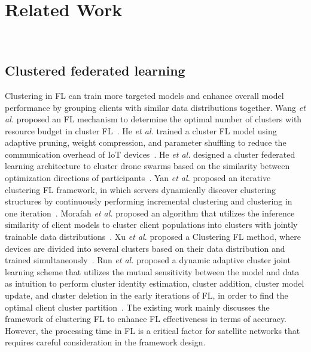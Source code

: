 \section{Related Work}~\label{sec:relatedwork}
\subsection{Clustered federated learning}
Clustering in FL can train more targeted models and enhance overall model performance by grouping clients with similar data distributions together. Wang \textit{et al.} proposed an FL mechanism to determine the optimal number of clusters with resource budget in cluster FL~\cite {WangTMC22}. He \textit{et al.} trained a cluster FL model using adaptive pruning, weight compression, and parameter shuffling to reduce the communication overhead of IoT devices~\cite {HeIOT24}. He \textit{et al.} designed a cluster federated learning architecture to cluster drone swarms based on the similarity between optimization directions of participants~\cite {HeTVT23}. Yan \textit{et al.} proposed an iterative clustering FL framework, in which servers dynamically discover clustering structures by continuously performing incremental clustering and clustering in one iteration~\cite{YanTNNLS23}. Morafah \textit{et al.} proposed an algorithm that utilizes the inference similarity of client models to cluster client populations into clusters with jointly trainable data distributions~\cite{MorafahOJCS23}. Xu \textit{et al.} proposed a Clustering FL method, where devices are divided into several clusters based on their data distribution and trained simultaneously~\cite{XuIOT24}. 
Run \textit{et al.} proposed a dynamic adaptive cluster joint learning scheme that utilizes the mutual sensitivity between the model and data as intuition to perform cluster identity estimation, cluster addition, cluster model update, and cluster deletion in the early iterations of FL, in order to find the optimal client cluster partition~\cite{RunKBS23}.
The existing work mainly discusses the framework of clustering FL to enhance FL effectiveness in terms of accuracy. 
However, the processing time in FL is a critical factor for satellite networks that requires careful consideration in the framework design.



